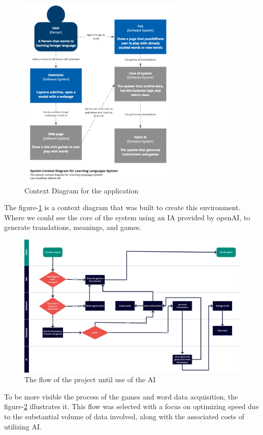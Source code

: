 \documentclass[12pt]{article}
\begin{document}
\begin{figure}[h]
\centering
\caption{
Context Diagram for the application
}
\label{fig:context_diagram}
\includegraphics[width=0.7\textwidth]{assets/4.png}
\end{figure}
The figure-\ref{fig:context_diagram} is a context diagram that was built to create this environment. Where we could see the core of the system using an IA provided by openAI, to generate translations, meanings, and games. \\
\begin{figure}[h]
  \centering
  \caption{
    The flow of the project until use of the AI
  }
  \label{fig:flow_diagram}
  \includegraphics[width=1\textwidth]{assets/26.png}
\end{figure}
To be more visible the process of the games and word data acquisition, the figure-\ref{fig:flow_diagram} illustrates it. This flow was selected with a focus on optimizing speed due to the substantial volume of data involved, along with the associated costs of utilizing AI. \\
\end{document}
